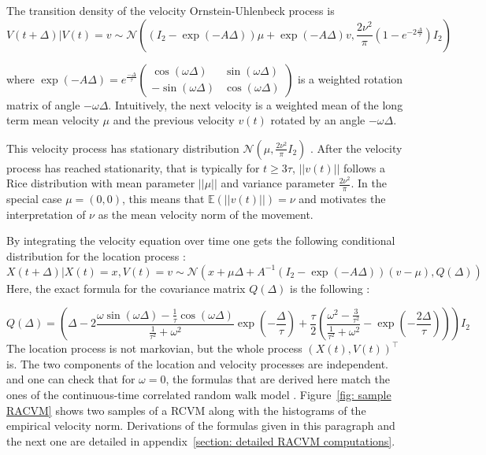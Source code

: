 \documentclass[11pt]{article}
\newcommand {\E}{\mathbb{E}}
\newcommand {\1}{\mathbb{1}}
\begin{document}
The transition density of the velocity Ornstein-Uhlenbeck process is  
\begin{equation}V(t+\Delta) \vert V(t)=v \sim \mathcal{N}\left( (I_2-\exp(-A\Delta))\mu + \exp(-A\Delta)v, \frac{2\nu^2}{\pi}(1-e^{-2\frac{\Delta}{\tau}}) I_2 \right) 
\end{equation}


where $\exp(-A\Delta)=e^{\frac{-\Delta}{\tau}} \begin{pmatrix} \cos(\omega \Delta) & \sin(\omega \Delta) \\ -\sin(\omega \Delta) & \cos(\omega \Delta) \end{pmatrix}$ is a weighted rotation matrix of angle $-\omega \Delta$.
Intuitively, the next velocity is a weighted mean of the long term mean velocity $\mu$ and the previous velocity $v(t)$ rotated by an angle $-\omega \Delta$.


This velocity process has stationary distribution $\mathcal{N}\left(\mu,\frac{2\nu^2}{\pi} I_2\right)$ \cite{gurarie_correlated_2017}. After the velocity process has reached stationarity, that is typically for $t \geq 3\tau$, $\vert \vert v(t) \vert \vert$ follows a Rice distribution with mean parameter $\vert \vert \mu \vert \vert$ and variance parameter $\frac{2\nu^2}{\pi}$. In the special case $\mu=(0,0)$, this means that $\E(\vert \vert v(t) \vert \vert)=\nu$ and motivates the interpretation of $\nu$ as the mean velocity norm of the movement.

By integrating the velocity equation over time one gets the following conditional distribution for the location process :
\begin{equation}
	X(t+\Delta) \vert X(t)=x, V(t)=v \sim \mathcal{N}\left(x+\mu \Delta+A^{-1} \left( I_2-\exp(-A\Delta)\right)(v-\mu),Q(\Delta)\right)  
\end{equation}
Here, the exact formula for the covariance matrix $Q(\Delta)$ is the following :

\[
Q(\Delta)=\left( \Delta-2 \frac{\omega \sin(\omega \Delta)-\frac{1}{\tau} \cos(\omega \Delta)}{\frac{1}{\tau^2}+\omega^2 } \exp\left( -\frac{\Delta}{\tau} \right) +\frac{\tau}{2} \left( \frac{\omega^2-\frac{3}{\tau^2}}{\frac{1}{\tau^2}+\omega^2}-\exp\left( -\frac{2\Delta}{\tau}\right)\right) \right) I_2
\]
The location process is not markovian, but the whole process $(X(t), V(t))^\top$ is.
The two components of the location and velocity processes are independent.
and one can check that for $\omega=0$, the formulas that are derived here match the ones of the continuous-time correlated random walk model \cite{johnson_continuoustime_2008}. Figure~\ref{fig: sample RACVM} shows two samples of a RCVM along with the histograms of the empirical velocity norm. Derivations of the formulas given in this paragraph and the next one are detailed in appendix~\ref{section: detailed RACVM computations}.\\
\end{document}
